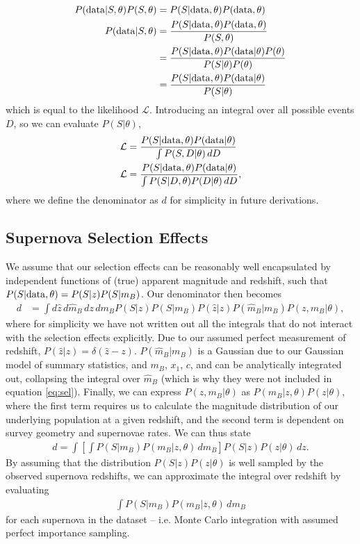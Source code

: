 \documentclass[a4paper,fleqn,usenatbib]{emulateapj}
\begin{document}
\begin{align}
P({\rm data} | S , \theta) P(S, \theta) &= P(S | {\rm data}, \theta) P({\rm data}, \theta)\\
P({\rm data} | S , \theta) &= \frac{ P(S | {\rm data}, \theta) P({\rm data}, \theta) }{ P(S, \theta) }\\
&= \frac{ P(S | {\rm data}, \theta) P({\rm data} | \theta) P(\theta)}{ P(S | \theta)  P(\theta)}\\
&= \frac{ P(S | {\rm data}, \theta) P({\rm data} | \theta)}{ P(S | \theta) }
\end{align}
which is equal to the likelihood $\mathcal{L}$. Introducing an integral over all possible events $D$, so we can evaluate $P(S|\theta)$, 
\begin{align}
\mathcal{L}&= \frac{P(S|{\rm data},\theta) P({\rm data}|\theta)}{\int P(S, D|\theta)\, dD} \\
\mathcal{L} &= \frac{P(S|{\rm data},\theta) P({\rm data}|\theta)}{\int P(S | D, \theta) P(D|\theta)\, dD}, \label{eq:app_main}
\end{align}
where we define the denominator as $d$ for simplicity in future derivations.



\subsection{Supernova Selection Effects}
\label{app:selection2}
We assume that our selection effects can be reasonably well encapsulated by independent functions of (true) apparent magnitude and redshift, such that $P(S|{\rm data}, \theta) = P(S|z) P(S|m_B)$. Our denominator then becomes
\begin{align}
d &= \int d\hat{z} \, d\hat{m}_B \, dz \, dm_B P(S|z) P(S|m_B) P(\hat{z}|z) P(\hat{m}_B|m_B) P(z, m_B | \theta), \label{eq:sel}
\end{align}
where for simplicity we have not written out all the integrals that do not interact with the selection effects explicitly. Due to our assumed perfect measurement of redshift, $P(\hat{z}|z) = \delta(\hat{z} - z)$. $P(\hat{m}_B | m_B)$ is a Gaussian due to our Gaussian model of summary statistics, and $m_B$, $x_1$, $c$, and can be analytically integrated out, collapsing the integral over $\hat{m}_B$ (which is why they were not included in equation \eqref{eq:sel}). Finally, we can express $P(z, m_B | \theta)$ as  $P(m_B | z, \theta) P(z | \theta)$, where the first term requires us to calculate the magnitude distribution of our underlying population at a given redshift, and the second term is dependent on survey geometry and supernovae rates. We can thus state
\begin{align}
d = \int \left[ \int P(S|m_B) P(m_B | z, \theta)\, dm_B \right] P(S|z)P(z|\theta)\, dz.
\end{align}
By assuming that the distribution $P(S|z)P(z|\theta)$ is well sampled by the observed supernova redshifts, we can approximate the integral over redshift by evaluating
\begin{align}
\int P(S|m_B) P(m_B | z, \theta)\, dm_B \label{eq:selint}
\end{align}
for each supernova in the dataset -- i.e. Monte Carlo integration with assumed perfect importance sampling.
\end{document}
